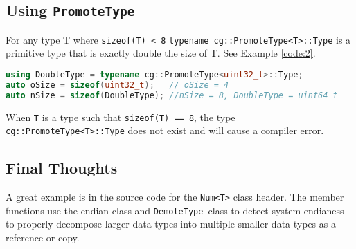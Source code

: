 \documentclass{article}
\newcommand{\theobj}{\protect\Verb+DemoteType +}
\newcommand{\theobjt}{\protect\Verb+PromoteType +}
\begin{document}
\subsection{Using \theobjt}

For any type T where \Verb+sizeof(T) < 8+ \Verb+typename cg::PromoteType<T>::Type+ is a primitive type that is exactly double the size of T. See Example \vref{code:2}.

\begin{lstlisting}[language=C++, label=code:2, caption=Promoting Types]
using DoubleType = typename cg::PromoteType<uint32_t>::Type;
auto oSize = sizeof(uint32_t);   // oSize = 4
auto nSize = sizeof(DoubleType); //nSize = 8, DoubleType = uint64_t
\end{lstlisting}


When \Verb+T+ is a type such that \Verb+sizeof(T) == 8+, the type \Verb+cg::PromoteType<T>::Type+ does not exist and will cause a compiler error.

\subsection{Final Thoughts}

A great example is in the source code for the \Verb+Num<T>+ class header. The member functions use the endian class and \theobj class to detect system endianess to properly decompose larger data types into multiple smaller data types as a reference or copy.
\end{document}
